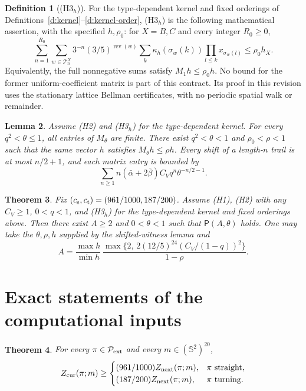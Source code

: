 \documentclass[11pt,reqno]{amsart}
\newtheorem{theorem}{Theorem}[section]
\newtheorem{lemma}[theorem]{Lemma}
\theoremstyle{definition}
\newtheorem{definition}[theorem]{Definition}
\theoremstyle{remark}
\begin{document}
\begin{definition}[(H3\(_h\))]\label{h:H3}
For the type-dependent kernel and fixed orderings of
Definitions~\ref{d:kernel}--\ref{d:kernel-order}, (H3\(_h\)) is the
following mathematical assertion, with the specified \(h,\rho_0\):
for \(X=B,C\) and every integer \(R_0\ge0\),
\[
 \sum_{n=1}^{R_0}\sum_{w\in\mathcal T_n^X}
 3^{-n}(3/5)^{\operatorname{rev}(w)}
 \sum_k\kappa_h(\sigma_w(k))\prod_{l\le k}x_{\sigma_w(l)}
       \le\rho_0h_X .
\]
Equivalently, the full nonnegative sums satisfy \(M_1h\le\rho_0h\).
No bound for the former uniform-coefficient matrix is part of this
contract. Its proof in this revision uses the stationary lattice
Bellman certificates, with no periodic spatial walk or remainder.
\end{definition}

\begin{lemma}\label{l:Mtheta}
Assume (H2) and (H3\(_h\)) for the type-dependent kernel.
For every \(q^2<\theta\le1\), all entries of \(M_\theta\) are
finite. There exist \(q^2<\theta<1\) and \(\rho_0<\rho<1\)
such that the same vector \(h\) satisfies \(M_\theta h\le\rho h\).
Every shift of a length-\(n\) trail is at most \(n/2+1\), and
each matrix entry is bounded by
\[
 \sum_{n\ge1} n(\bar\alpha+2\bar\beta)
                      C_V q^n\theta^{-n/2-1}.
\]
\end{lemma}

\begin{theorem}\label{t:rec}
Fix \((c_{\rm s},c_{\rm t})=(961/1000,187/200)\).
Assume (H1), (H2) with any \(C_V\ge1\), \(0<q<1\), and
(H3\(_h\)) for the type-dependent kernel and fixed orderings above.
Then there exist \(A\ge2\) and \(0<\theta<1\) such that
\(\mathsf P(A,\theta)\) holds.
One may take the \(\theta,\rho,h\) supplied by the shifted-witness
lemma and
\[
 A=\frac{\max h}{\min h}\,
       \frac{\max\{2,\,2(12/5)^{24}(C_V/(1-q))^2\}}{1-\rho}.
\]
\end{theorem}


\section{Exact statements of the computational inputs}

\begin{theorem}\label{t:H1}
For every \(\pi\in\mathcal P_{\rm ext}\) and every
\(m\in(\mathbb S^2)^{20}\),
\[
 Z_{\rm cur}(\pi;m)\ge
 \begin{cases}
 (961/1000)Z_{\rm next}(\pi;m),&\pi\text{ straight},\\
 (187/200)Z_{\rm next}(\pi;m),&\pi\text{ turning}.
 \end{cases}
\]
\end{theorem}
\end{document}
